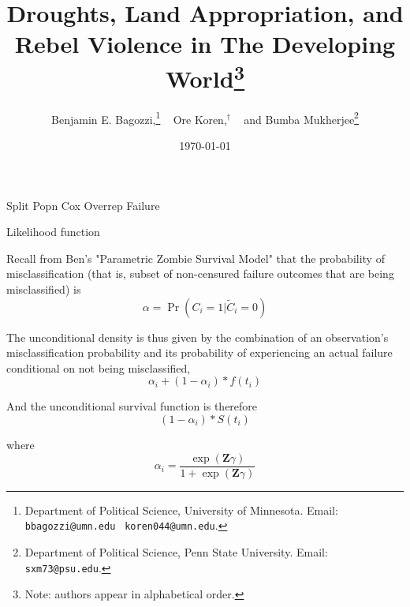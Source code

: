 \documentclass[a4paper, 12pt]{article}
\makeatletter
\renewcommand{\section}{\@startsection
    {section}    {1}    {0mm}    {-0.7\baselineskip}    {0.08\baselineskip}    {\normalfont\large\sc\center\bf}}
\renewcommand{\subsection}{\@startsection
    {subsection}    {2}    {0mm}    {-0.5\baselineskip}    {0.01\baselineskip}    {\normalfont\normalsize\itshape\center}}
\makeatother
\begin{document}
\date{\today }
\title{Droughts, Land Appropriation, and Rebel Violence in The Developing
World\thanks{%
Note: authors appear in alphabetical order.}}
\author{Benjamin E. Bagozzi,\thanks{%
Department of Political Science, University of Minnesota. Email: \texttt{%
bbagozzi@umn.edu} \texttt{\ koren044@umn.edu}.} ~ Ore Koren,$^\dagger$ ~ and
Bumba Mukherjee\thanks{%
Department of Political Science, Penn State University. Email: \texttt{%
sxm73@psu.edu}.}}
\maketitle

\clearpage \pagebreak \renewcommand{\thefigure}{\arabic{figure}} %
\setcounter{figure}{0} \renewcommand{\thepage}{\arabic{page}} %
\setcounter{page}{1} \pagestyle{plain} \doublespace

\section{Split Popn Cox Overrep Failure}

\subsection{Likelihood function}

\noindent Recall from Ben's "Parametric Zombie Survival Model" that the
probability of misclassification (that is, subset of non-censured failure
outcomes that are being misclassified) is%
\begin{equation}
\alpha =\Pr (C_{i}=1|\widetilde{C}_{i}=0)
\end{equation}

The unconditional density is thus given by the combination of an
observation's misclassification probability and its probability of
experiencing an actual failure conditional on not being misclassified,%
\begin{equation}
\alpha _{i}+(1-\alpha _{i})\ast f(t_{i})
\end{equation}

And the unconditional survival function is therefore%
\begin{equation}
(1-\alpha _{i})\ast S(t_{i})
\end{equation}

where%
\begin{equation}
\alpha _{i}=\frac{\exp (\mathbf{Z}\gamma )}{1+\exp (\mathbf{Z}\gamma )}
\end{equation}
\end{document}
